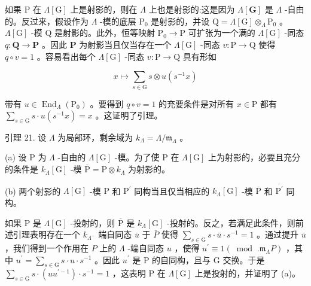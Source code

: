 \documentclass[10pt]{article}
\begin{document}
如果 \(\mathrm{P}\) 在 \(\Lambda \left\lbrack  \mathrm{G}\right\rbrack\) 上是射影的，则在 \(\Lambda\) 上也是射影的:这是因为 \(\Lambda \left\lbrack  \mathbf{G}\right\rbrack\) 是 \(\Lambda\) -自由的。反过来，假设作为 \(\Lambda\) -模的底层 \({\mathrm{P}}_{0}\) 是射影的，并设 \(\mathrm{Q} = \Lambda \left\lbrack  \mathrm{G}\right\rbrack  { \otimes  }_{\Lambda }{\mathrm{P}}_{0}\) 。 \(\Lambda \left\lbrack  \mathrm{G}\right\rbrack\) -模 \(\mathrm{Q}\) 是射影的。此外，恒等映射 \({\mathrm{P}}_{0} \rightarrow  \mathrm{P}\) 可扩张为一个满的 \(\Lambda \left\lbrack  \mathrm{G}\right\rbrack\) -同态 \(q : \mathbf{Q} \rightarrow  \mathbf{P}\) 。因此 \(\mathbf{P}\) 为射影当且仅当存在一个 \(\Lambda \left\lbrack  \mathrm{G}\right\rbrack\) -同态 \(v : \mathrm{P} \rightarrow  \mathrm{Q}\) 使得 \(q \circ  v = 1\) 。容易看出每个 \(\Lambda \left\lbrack  \mathrm{G}\right\rbrack\) -同态 \(v : \mathrm{P} \rightarrow  \mathrm{Q}\) 具有形如

\[
x \mapsto  \mathop{\sum }\limits_{{s \in  \mathrm{G}}}s \otimes  u\left( {{s}^{-1}x}\right)
\]

带有 \(u \in  {\operatorname{End}}_{\Lambda }\left( {\mathrm{P}}_{0}\right)\) 。要得到 \(q \circ  v = 1\) 的充要条件是对所有 \(x \in  \mathrm{P}\) 都有 \(\mathop{\sum }\limits_{{s \in  \mathrm{G}}}s \cdot  u\left( {{s}^{-1}x}\right)  = x\) 。这证明了引理。

引理 21. 设 \(\Lambda\) 为局部环，剩余域为 \({k}_{\Lambda } = \Lambda /{\mathfrak{m}}_{\Lambda }\) 。

(a) 设 \(\mathrm{P}\) 为 \(\Lambda\) -自由的 \(\Lambda \left\lbrack  \mathrm{G}\right\rbrack\) -模。为了使 \(\mathrm{P}\) 在 \(\Lambda \left\lbrack  \mathrm{G}\right\rbrack\) 上为射影的，必要且充分的条件是 \({k}_{\Lambda }\left\lbrack  \mathrm{G}\right\rbrack\) -模 \(\overline{\mathrm{P}} = \mathrm{P} \otimes  {k}_{\Lambda }\) 为射影的。

(b) 两个射影的 \(\Lambda \left\lbrack  \mathrm{G}\right\rbrack\) -模 \(\mathrm{P}\) 和 \({\mathrm{P}}^{\prime }\) 同构当且仅当相应的 \({k}_{\Lambda }\left\lbrack  \mathrm{G}\right\rbrack\) -模 \(\overline{\mathrm{P}}\) 和 \(\overline{{\mathrm{P}}^{\prime }}\) 同构。

如果 \(\mathrm{P}\) 是 \(\Lambda \left\lbrack  \mathrm{G}\right\rbrack\) -投射的，则 \(\overline{\mathrm{P}}\) 是 \({k}_{\Lambda }\left\lbrack  \mathrm{G}\right\rbrack\) -投射的。反之，若满足此条件，则前述引理表明存在一个 \({k}_{{\Lambda }^{ - }}\) 端自同态 \(\bar{u}\) 于 \(\bar{P}\) 使得 \(\mathop{\sum }\limits_{{s \in  \mathrm{G}}}s \cdot  \bar{u} \cdot  {s}^{-1} = 1\) 。通过提升 \(\bar{u}\) ，我们得到一个作用在 \(P\) 上的 \(\Lambda\) -端自同态 \(u\) ，使得 \({u}^{\prime } \equiv  1\left( {{\;\operatorname{mod}\;.}{\mathfrak{m}}_{\Lambda }P}\right)\) ，其中 \({u}^{\prime } = \mathop{\sum }\limits_{{s \in  \mathrm{G}}}s \cdot  u \cdot  {s}^{-1}\) 。因此 \({u}^{\prime }\) 是 \(\mathrm{P}\) 的自同构，且与 G 交换。于是 \(\mathop{\sum }\limits_{{s \in  \mathrm{G}}}s \cdot  \left( {u{u}^{\prime  - 1}}\right)  \cdot  {s}^{-1} = 1\) ，这表明 \(\mathrm{P}\) 在 \(\Lambda \left\lbrack  \mathrm{G}\right\rbrack\) 上是投射的，并证明了 (a)。
\end{document}
